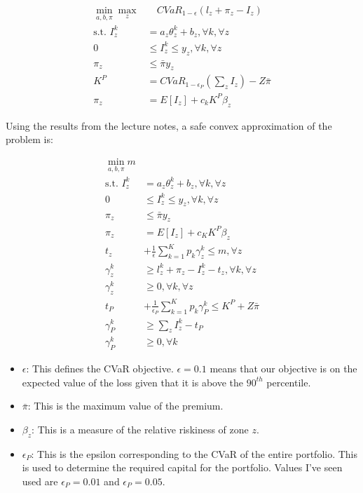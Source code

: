 \documentclass[11pt]{article}
\begin{document}
\begin{align}
    \min_{a,b,\pi} \max_z &\quad CVaR_{1-\epsilon}(l_z + \pi_z -I_z)\\
    \text{s.t.   } I_z^k &= a_z\theta^k_z +b_z, \forall k, \forall z\\
    0 &\leq I_z^k \leq y_z, \forall k, \forall z \\
    \pi_z &\leq \bar{\pi}y_z \\
    K^P &= CVaR_{1-\epsilon_P}\left (\sum_z I_z \right ) - Z\bar{\pi}\\
    \pi_z &= E[I_z]+c_k K^P \beta_z
\end{align}

Using the results from the lecture notes, a safe convex approximation of the problem is: 

\begin{align}
    \min_{a,b,\pi} m\\
    \text{s.t.   } I_z^k &= a_z\theta^k_z +b_z, \forall k, \forall z\\
    0 &\leq I_z^k \leq y_z, \forall k, \forall z \\
    \pi_z &\leq \bar{\pi}y_z\\
    \pi_z &= E[I_z]+c_K K^P\beta_z\\
    t_z &+ \frac{1}{\epsilon} \sum_{k=1}^K p_k \gamma_z^k \leq m, \forall z \\
    \gamma_z^k &\geq l_z^k + \pi_z -I_z^k -t_z, \forall k, \forall z\\
    \gamma_z^k &\geq 0, \forall k, \forall z\\
    t_P &+ \frac{1}{\epsilon_P} \sum_{k=1}^K p_k \gamma_P^k \leq K^P + Z \bar{\pi}\\
    \gamma_P^k &\geq \sum_z I_z^k -t_P\\
    \gamma_P^k &\geq 0, \forall k
\end{align}

\begin{itemize}
    \item $\epsilon$: This defines the CVaR objective. $\epsilon = 0.1$ means that our objective is on the expected value of the loss given that it is above the $90^{th}$ percentile. 
    \item $\bar{\pi}$: This is the maximum value of the premium. 
    \item $\beta_z$: This is a measure of the relative riskiness of zone $z$. 
    \item $\epsilon_P$: This is the epsilon corresponding to the CVaR of the entire portfolio. This is used to determine the required capital for the portfolio. Values I've seen used are $\epsilon_P=0.01$ and $\epsilon_P=0.05$. 
\end{itemize}
\end{document}
